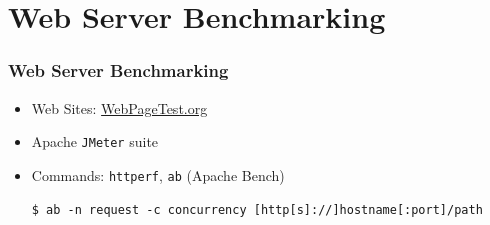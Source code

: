 \documentclass{beamer}
\begin{document}
\section{Web Server Benchmarking}
\begin{frame}[fragile]
\frametitle{Web Server Benchmarking}
\begin{itemize}
  \item Web Sites: \url{WebPageTest.org}
  \item Apache  \texttt{JMeter} suite
  \item Commands:  \texttt{httperf}, \texttt{ab} (Apache Bench)
\lstset{language=shell}
\begin{lstlisting}[escapechar=!]
$ ab -n request -c concurrency [http[s]://]hostname[:port]/path
\end{lstlisting}
   \end{itemize}
\end{frame}
\end{document}
